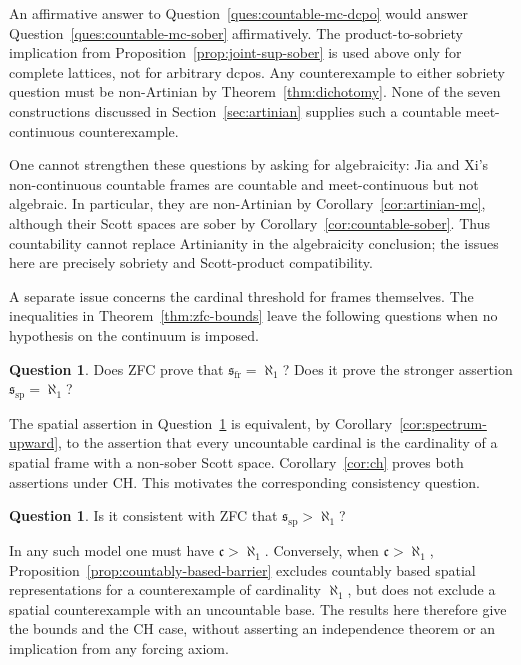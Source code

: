 \documentclass[11pt,reqno]{amsart}
\theoremstyle{definition}
\newtheorem{question}[theorem]{Question}
\numberwithin{equation}{section}
\newcommand{\ssp}{\mathfrak{s}_{\mathrm{sp}}}
\newcommand{\sfr}{\mathfrak{s}_{\mathrm{fr}}}
\newcommand{\cc}{\mathfrak{c}}
\begin{document}
An affirmative answer to Question~\ref{ques:countable-mc-dcpo} would
answer Question~\ref{ques:countable-mc-sober} affirmatively. The
product-to-sobriety implication from Proposition~\ref{prop:joint-sup-sober}
is used above only for complete lattices, not for arbitrary dcpos.
Any counterexample to either sobriety question must be non-Artinian by
Theorem~\ref{thm:dichotomy}. None of the seven constructions discussed
in Section~\ref{sec:artinian} supplies such a countable meet-continuous
counterexample.

One cannot strengthen these questions by asking for algebraicity:
Jia and Xi's non-continuous countable frames \citep{JiaXi2026} are
countable and meet-continuous but not algebraic. In particular, they
are non-Artinian by Corollary~\ref{cor:artinian-mc}, although their
Scott spaces are sober by Corollary~\ref{cor:countable-sober}.
Thus countability cannot replace Artinianity in the algebraicity
conclusion; the issues here are precisely sobriety and Scott-product
compatibility.

A separate issue concerns the cardinal threshold for frames themselves.
The inequalities in Theorem~\ref{thm:zfc-bounds} leave the following
questions when no hypothesis on the continuum is imposed.

\begin{question}\label{ques:cardinality}
Does ZFC prove that $\sfr=\aleph_1$? Does it prove the stronger assertion
$\ssp=\aleph_1$?
\end{question}

The spatial assertion in Question~\ref{ques:cardinality} is equivalent,
by Corollary~\ref{cor:spectrum-upward}, to the assertion that every
uncountable cardinal is the cardinality of a spatial frame with a
non-sober Scott space. Corollary~\ref{cor:ch} proves both assertions under
CH. This motivates the corresponding consistency question.

\begin{question}\label{ques:independence}
Is it consistent with ZFC that $\ssp>\aleph_1$?
\end{question}

In any such model one must have $\cc>\aleph_1$. Conversely, when
$\cc>\aleph_1$, Proposition~\ref{prop:countably-based-barrier} excludes
countably based spatial representations for a counterexample of
cardinality $\aleph_1$, but does not exclude a spatial counterexample
with an uncountable base. The results here therefore give the bounds and
the CH case, without asserting an independence theorem or an implication
from any forcing axiom.
\end{document}
